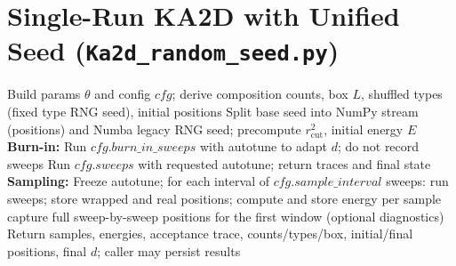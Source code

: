 \documentclass[11pt]{article}
\begin{document}
\section*{Single-Run KA2D with Unified Seed (\texttt{Ka2d\_random\_seed.py})}
\begin{algorithm}[t]
\caption{Deterministic KA2D MC with burn-in and interval sampling}
\label{alg:ka2d-random-seed}
\begin{algorithmic}[1]
  \State Build params \(\theta\) and config \(cfg\); derive composition counts, box \(L\), shuffled types (fixed type RNG seed), initial positions
  \State Split base seed into NumPy stream (positions) and Numba legacy RNG seed; precompute \(r_\mathrm{cut}^2\), initial energy \(E\)
  \State \textbf{Burn-in:} Run \(cfg.burn\_in\_sweeps\) with autotune to adapt \(d\); do not record sweeps
   \State Run \(cfg.sweeps\) with requested autotune; return traces and final state \EndIf
  \State \textbf{Sampling:} Freeze autotune; for each interval of \(cfg.sample\_interval\) sweeps:
    \State \quad run sweeps; store wrapped and real positions; compute and store energy per sample
    \State \quad capture full sweep-by-sweep positions for the first window (optional diagnostics)
  \State Return samples, energies, acceptance trace, counts/types/box, initial/final positions, final \(d\); caller may persist results
\end{algorithmic}
\end{algorithm}
\end{document}
